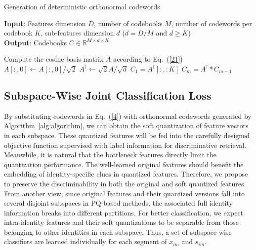 \documentclass{elsarticle}
\begin{document}
{\linespread{1.3}
\begin{algorithm}[h]
\caption{Generation of deterministic orthonormal codewords}
\label{alg:algorithm}
\textbf{Input}: Features dimension $D$, number of codebooks $M$, number of codewords per codebook $K$, sub-features dimension $d$ ($d= D/M$ and $d \geq K$)
\\
\textbf{Output}: Codebooks $C\in \mathbb{R}^{M \times d \times K}$ %

\begin{algorithmic}[1]
\State Compute the cosine basis matrix $A$ according to Eq.~(\ref{21})
\State $A[:, 0] \leftarrow A[:, 0] / \sqrt{2}$ 
\State $A^\dagger \leftarrow \sqrt{2}A /\sqrt{d}$
\State $C_1 = A^\dagger[:, :K]$
    \State $C_m = A^\dagger * C_{m-1}$
\EndFor
\end{algorithmic}
\end{algorithm}
}

\subsection{Subspace-Wise Joint Classification Loss}
By substituting codewords in Eq.~(\ref{4}) with orthonormal codewords generated by Algorithm~\ref{alg:algorithm}, we can obtain the soft quantization of feature vectors in each subspace. These quantized features will be fed into the carefully designed objective function supervised with label information for discriminative retrieval. Meanwhile, it is natural that the bottleneck features directly limit the quantization performance. The well-learned original features should benefit the embedding of identity-specific clues in quantized features. Therefore, we propose to preserve the discriminability in both the original and soft quantized features. From another view, since original features and their quantized versions fall into several disjoint subspaces in PQ-based methods, the associated full identity information breaks into different partitions. For better classification, we expect intra-identity features and their soft quantizations to be separable from those belonging to other identities in each subspace. Thus, a set of subspace-wise classifiers are learned individually for each segment of $x_{im}$ and $s_{im}$.
\end{document}

